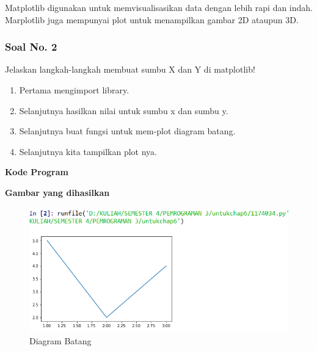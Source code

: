 \hfill \break
Matplotlib digunakan untuk memvisualisasikan data dengan lebih rapi dan indah. Marplotlib juga mempunyai plot untuk menampilkan gambar 2D ataupun 3D.

\subsubsection{Soal No. 2}
\hfill \break
Jelaskan langkah-langkah membuat sumbu X dan Y di matplotlib!

\begin{enumerate}
	\item Pertama mengimport library.	
	
	
	\item Selanjutnya hasilkan nilai untuk sumbu x dan sumbu y.	
	
	
	\item Selanjutnya buat fungsi untuk mem-plot diagram batang.
		

	\item Selanjutnya kita tampilkan plot nya.
	
	
\end{enumerate}
\hfill \break
\textbf{Kode Program}



\hfill \break
\textbf{Gambar yang dihasilkan}

\begin{figure}[H]
	\includegraphics[width=12cm]{figures/6/1174034/Teori/2.png}
	\centering
	\caption{Diagram Batang}
\end{figure}
 
